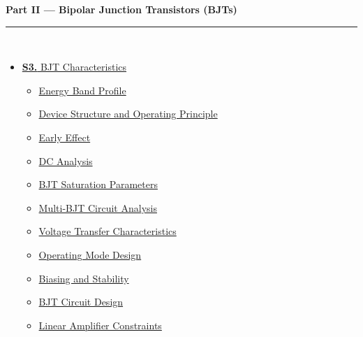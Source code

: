 \documentclass[12pt]{article}
\begin{document}
\vspace{6pt}



\begin{tcolorbox}[breakable,colback=cC!5,colframe=cC,boxrule=1pt,arc=5pt,
  left=8pt,right=8pt,top=8pt,bottom=8pt,before skip=4pt]
  {\large\bfseries\textcolor{cC}{Part II --- Bipolar Junction Transistors (BJTs)}}\\[5pt]
  \textcolor{cC!40}{\rule{\textwidth}{0.4pt}}\\[3pt]
  \small\begin{itemize}[leftmargin=1.2em,itemsep=1pt,label={\textcolor{cC}{$\triangleright$}}]

    \item \hyperref[sec:S3]{\textbf{S3.} BJT Characteristics}
      \begin{itemize}[leftmargin=1.5em,itemsep=0pt,label={\textcolor{cA}{$\cdot$}}]
        \item \hyperref[sub:s3-energy]{Energy Band Profile}
        \item \hyperref[sub:s3-structure]{Device Structure and Operating Principle}
        \item \hyperref[sub:s3-early]{Early Effect}
        \item \hyperref[sub:s3-dc]{DC Analysis}
        \item \hyperref[sub:s3-saturation]{BJT Saturation Parameters}
        \item \hyperref[sub:s3-multibjtdc]{Multi-BJT Circuit Analysis}
        \item \hyperref[sub:s3-vtc]{Voltage Transfer Characteristics}
        \item \hyperref[sub:s3-opmode]{Operating Mode Design}
        \item \hyperref[sub:s3-biasing]{Biasing and Stability}
        \item \hyperref[sub:s3-design]{BJT Circuit Design}
        \item \hyperref[sub:s3-linear]{Linear Amplifier Constraints}
        

\end{itemize}
\end{itemize}
\end{tcolorbox}
\end{document}
